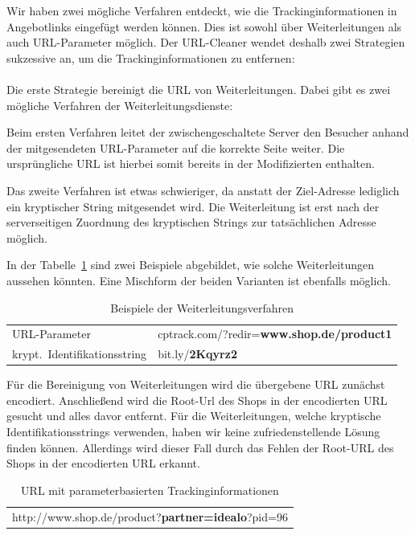 Wir haben zwei mögliche Verfahren entdeckt, wie die Trackinginformationen in Angebotlinks eingefügt werden können.
Dies ist sowohl über Weiterleitungen als auch URL-Parameter möglich.
Der URL-Cleaner wendet deshalb zwei Strategien sukzessive an, um die Trackinginformationen zu entfernen:
\\
~\\
Die erste Strategie bereinigt die URL von Weiterleitungen.
Dabei gibt es zwei mögliche Verfahren der Weiterleitungsdienste:

Beim ersten Verfahren leitet der zwischengeschaltete Server den Besucher anhand der mitgesendeten URL-Parameter auf
die korrekte Seite weiter.
Die ursprüngliche URL ist hierbei somit bereits in der Modifizierten enthalten.

Das zweite Verfahren ist etwas schwieriger, da anstatt der Ziel-Adresse lediglich ein kryptischer String mitgesendet
wird.
Die Weiterleitung ist erst nach der serverseitigen Zuordnung des kryptischen Strings zur tatsächlichen Adresse möglich.

In der Tabelle~\ref{tab:redirect} sind zwei Beispiele abgebildet, wie solche Weiterleitungen aussehen könnten.
Eine Mischform der beiden Varianten ist ebenfalls möglich.

\begin{table}[h]
    \centering
    \begin{tabular}{ l | l }
        URL-Parameter                 &   cptrack.com/?redir=\textbf{www.shop.de/product1}\\
        krypt.\ Identifikationsstring   &   bit.ly/\textbf{2Kqyrz2}
    \end{tabular}
    \caption{Beispiele der Weiterleitungsverfahren}
    \label{tab:redirect}
\end{table}

Für die Bereinigung von Weiterleitungen wird die übergebene URL zunächst encodiert.
Anschließend wird die Root-Url des Shops in der encodierten URL gesucht und alles davor entfernt.
Für die Weiterleitungen, welche kryptische Identifikationsstrings verwenden, haben wir keine zufriedenstellende Lösung
finden können.
Allerdings wird dieser Fall durch das Fehlen der Root-URL des Shops in der encodierten URL erkannt.

\begin{table}[h]
    \centering
    \begin{tabular}{ c }
        http://www.shop.de/product?\textbf{partner=idealo}?pid=96
    \end{tabular}
    \caption{URL mit parameterbasierten Trackinginformationen}
    \label{tab:trackparameter}
\end{table}

